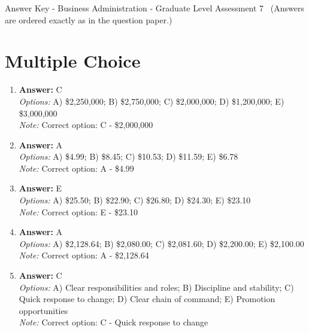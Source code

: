 \documentclass[12pt]{article}
\begin{document}
\begin{center}
Answer Key - Business Administration - Graduate Level Assessment 7 \
\small (Answers are ordered exactly as in the question paper.)
\end{center}

\section*{Multiple Choice}
\begin{enumerate}[label=\arabic*.]
\item \textbf{Answer:} C
\\ \textit{Options:} A) \$2,250,000; B) \$2,750,000; C) \$2,000,000; D) \$1,200,000; E) \$3,000,000
\\ \textit{Note:} Correct option: C - \$2,000,000
\item \textbf{Answer:} A
\\ \textit{Options:} A) \$4.99; B) \$8.45; C) \$10.53; D) \$11.59; E) \$6.78
\\ \textit{Note:} Correct option: A - \$4.99
\item \textbf{Answer:} E
\\ \textit{Options:} A) \$25.50; B) \$22.90; C) \$26.80; D) \$24.30; E) \$23.10
\\ \textit{Note:} Correct option: E - \$23.10
\item \textbf{Answer:} A
\\ \textit{Options:} A) \$2,128.64; B) \$2,080.00; C) \$2,081.60; D) \$2,200.00; E) \$2,100.00
\\ \textit{Note:} Correct option: A - \$2,128.64
\item \textbf{Answer:} C
\\ \textit{Options:} A) Clear responsibilities and roles; B) Discipline and stability; C) Quick response to change; D) Clear chain of command; E) Promotion opportunities
\\ \textit{Note:} Correct option: C - Quick response to change
\end{enumerate}
\end{document}

